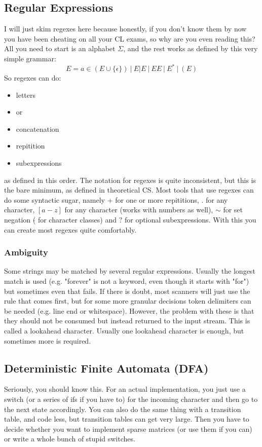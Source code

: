 \documentclass{article}
\begin{document}
\subsection{Regular Expressions}
I will just skim regexes here because honestly, if you don't know them by now you have been cheating on all your CL exams, so why are you even reading this?
All you need to start is an alphabet $\Sigma$, and the rest works as defined by this very simple grammar:
\begin{equation*}
	E = a \in (E \cup \{\epsilon\})\ |\ E|E\ |\ EE\ |\ E^*\ |\ (E)
\end{equation*}
So regexes can do:
\begin{itemize}
	\item letters
	\item or
	\item concatenation
	\item repitition
	\item subexpressions
\end{itemize}
as defined in this order.
The notation for regexes is quite inconsistent, but this is the bare minimum, as defined in theoretical CS.
Most tools that use regexes can do some syntactic sugar, namely $+$ for one or more repititions, $.$ for any character, $\left[a-z\right]$ for any character (works with numbers as well), $\sim$ for set negation ($\hat{ }$ for character classes) and $?$ for optional subexpressions.
With this you can create most regexes quite comfortably.

\subsubsection{Ambiguity}
Some strings may be matched by several regular expressions.
Usually the longest match is used (e.g. "forever" is not a keyword, even though it starts with "for") but sometimes even that fails.
If there is doubt, most scanners will just use the rule that comes first, but for some more granular decisions token delimiters can be needed (e.g. line end or whitespace).
However, the problem with these is that they should not be consumed but instead returned to the input stream.
This is called a lookahead character.
Usually one lookahead character is enough, but sometimes more is required.

\subsection{Deterministic Finite Automata (DFA)}
Seriously, you should know this.
For an actual implementation, you just use a switch (or a series of ifs if you have to) for the incoming character and then go to the next state accordingly.
You can also do the same thing with a transition table, and code less, but transition tables can get very large.
Then you have to decide whether you want to implement sparse matrices (or use them if you can) or write a whole bunch of stupid switches.
\end{document}

